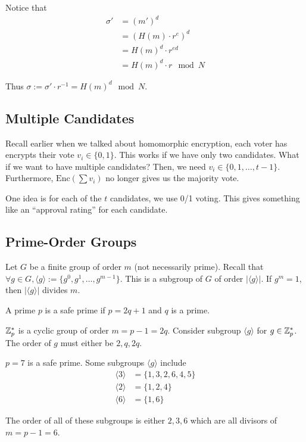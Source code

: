 Notice that 
\begin{align*}
    \sigma' &= (m')^d\\
    &= (H(m)\cdot r^e)^d\\
    &= H(m)^d \cdot r^{ed}\\
    &= H(m)^d \cdot r \mod N
\end{align*}

Thus $\sigma := \sigma' \cdot r^{-1} = H(m)^d \mod N$.

\subsection{Multiple Candidates}

Recall earlier when we talked about homomorphic encryption, each voter has encrypts their vote $v_i \in \{0, 1\}$. This works if we have only two candidates. What if we want to have multiple candidates? Then, we need $v_i \in \{0, 1, \dots, t-1\}$. Furthermore, $\text{Enc}(\sum v_i)$ no longer gives us the majority vote.

One idea is for each of the $t$ candidates, we use 0/1 voting. This gives something like an ``approval rating'' for each candidate. 

\subsection{Prime-Order Groups}

Let $G$ be a finite group of order $m$ (not necessarily prime). Recall that $\forall g \in G, \langle g \rangle := \{ g^0, g^1, \dots, g^{m-1}\}.$ This is a subgroup of $G$ of order $|\langle g\rangle |$. If $g^m = 1$, then $|\langle g \rangle |$ divides $m$.

\begin{definition}
    A prime $p$ is a safe prime if $p = 2q + 1$ and $q$ is a prime.
\end{definition}

\begin{lemma}
    $\mathbb Z_p^*$ is a cyclic group of order $m = p-1 = 2q$. Consider subgroup $\langle g \rangle$ for $g \in \mathbb Z_p^*$. The order of $g$ must either be $2, q, 2q$.
\end{lemma}
 
\begin{example}
    $p=7$ is a safe prime. Some subgroups $\langle g \rangle$ include
    \begin{align*}
        \langle 3 \rangle &= \{1, 3, 2, 6, 4, 5\} \\
        \langle 2 \rangle &= \{ 1, 2, 4\} \\
        \langle 6 \rangle &= \{1, 6\}
    \end{align*}

    The order of all of these subgroups is either $2, 3, 6$ which are all divisors of $m = p-1 = 6$.
\end{example}